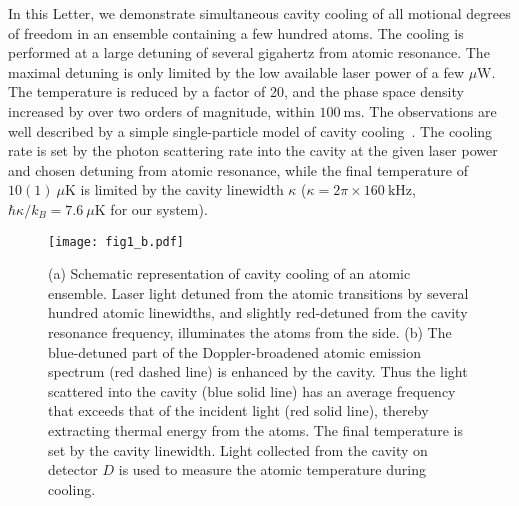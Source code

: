 \documentclass[aps,prl,superscriptaddress,onecloumn,nobibnotes]{revtex4-1}
\begin{document}
 In this Letter, we demonstrate simultaneous cavity cooling of all motional degrees of freedom in an ensemble containing a few hundred atoms. The cooling is performed at a large detuning of several gigahertz from atomic resonance. The maximal detuning is only limited by the low available laser power of a few $\mu\mathrm{W}$. The temperature is reduced by a factor of 20, and the phase space density increased by over two orders of magnitude, within $100 ~\mathrm{ms}$. The observations are well described by a simple single-particle model of cavity cooling~\cite{VV:pra2001}. The cooling rate is set by the photon scattering rate into the cavity at the given laser power and chosen detuning from atomic resonance, while the final temperature of $10(1)~\mu\mathrm{K}$ is limited by the cavity linewidth $\kappa$ ($\kappa=2\pi\times 160 ~\mathrm{kHz}$, $\hbar \kappa/k_B=7.6~\mu\mathrm{K}$ for our system).
  
 \begin{figure}[!th]
\centerline{\texttt{[image: fig1\_b.pdf]}}
\caption{(a) Schematic representation of cavity cooling of an atomic ensemble. Laser light detuned from the atomic
 transitions by several hundred atomic linewidths, and slightly red-detuned from the cavity resonance frequency, illuminates the atoms
  from the side. (b) The blue-detuned part of the Doppler-broadened atomic emission spectrum (red dashed line) is enhanced by the cavity. Thus the light scattered into the cavity (blue solid line) has an average frequency that exceeds that of the incident light (red solid line), thereby extracting thermal energy from the atoms. The final temperature is set by the cavity linewidth. Light collected from the cavity on detector $D$ is used to measure the atomic temperature during cooling.}
   
\label{fig1}
\end{figure}  
\end{document}

